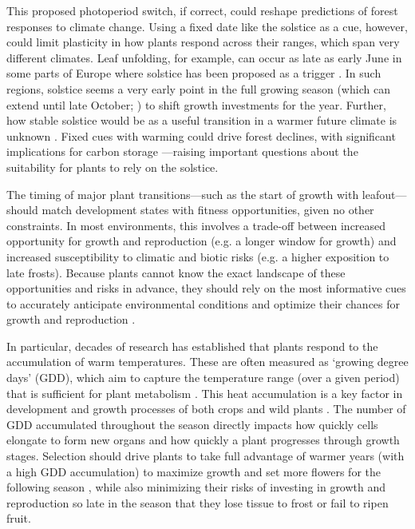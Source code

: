 \documentclass[11pt,letter]{article}
\begin{document}
This proposed photoperiod switch, if correct, could reshape predictions of forest responses to climate change. 
Using a fixed date like the solstice as a cue, however, could limit plasticity in how plants respond across their ranges, which span very different climates.
Leaf unfolding, for example, can occur as late as early June in some parts of Europe where solstice has been proposed as a trigger \citep{Zhang2022}. In such regions, solstice seems a very early point in the full growing season (which can extend until late October; \citealp{Liu2020}) to shift growth investments for the year. Further, how stable solstice would be as a useful transition in a warmer future climate is unknown \citep{Bonamour2019}. 
Fixed cues with warming could drive forest declines, with significant implications for carbon storage \citep{green2022limits}---raising important questions about the suitability for plants to rely on the solstice. 

The timing of major plant transitions---such as the start of growth with leafout---should match development states with fitness opportunities, given no other constraints. In most environments, this involves a trade-off between increased opportunity for growth and reproduction (e.g. a longer window for growth) and increased susceptibility to climatic and biotic risks (e.g. a higher exposition to late frosts). Because plants cannot know the exact landscape of these opportunities and risks in advance, they should rely on the most informative cues to accurately anticipate environmental conditions and optimize their chances for growth and reproduction \citep{Chevin2015, Bonamour2019}.

In particular, decades of research has established that plants respond to the accumulation of warm temperatures. These are often measured as `growing degree days' (GDD), which aim to capture the temperature range (over a given period) that is sufficient for plant metabolism \citep{Chuine2017}.
This heat accumulation is a key factor in development and growth processes of both crops \citep[e.g.][]{Cross1972} and wild plants \citep[e.g.][]{Hunter1992}. The number of GDD accumulated throughout the season directly impacts how quickly cells elongate to form new organs and how quickly a plant progresses through growth stages. Selection should drive plants to take full advantage of warmer years (with a high GDD accumulation) to maximize growth and set more flowers for the following season \citep{larcher1980}, while also minimizing their risks of investing in growth and reproduction so late in the season that they lose tissue to frost or fail to ripen fruit.
\end{document}
